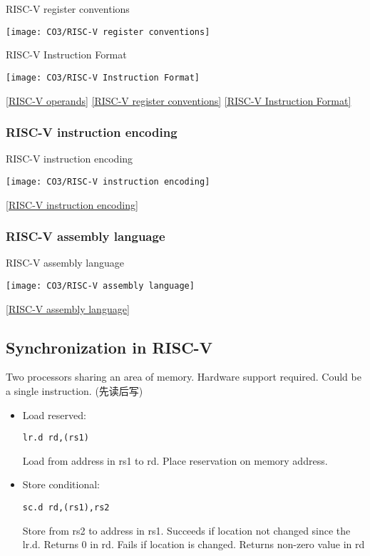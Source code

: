 \begin{table*}[hptb]
    \centering
    \caption{RISC-V register conventions}
    \label{RISC-V register conventions}
    \texttt{[image: CO3/RISC-V register conventions]}
\end{table*}

\begin{table*}[hptb]
    \centering
    \caption{RISC-V Instruction Format}
    \label{RISC-V Instruction Format}
    \texttt{[image: CO3/RISC-V Instruction Format]}
\end{table*}

\ref{RISC-V operands}
\ref{RISC-V register conventions}
\ref{RISC-V Instruction Format}



\subsubsection{RISC-V instruction encoding}
\begin{table*}[hptb]
    \centering
    \caption{RISC-V instruction encoding}
    \label{RISC-V instruction encoding}
    \texttt{[image: CO3/RISC-V instruction encoding]}
\end{table*}
\ref{RISC-V instruction encoding}

\subsubsection{RISC-V assembly language}
\begin{table*}[hptb]
    \centering
    \caption{RISC-V assembly language}
    \label{RISC-V assembly language}
    \texttt{[image: CO3/RISC-V assembly language]}
\end{table*}
\ref{RISC-V assembly language}


\subsection{Synchronization in RISC-V}
Two processors sharing an area of memory. Hardware support required. Could be a single instruction. (先读后写)

\begin{itemize}
    \item Load reserved: 
    \begin{lstlisting}[language={[x86masm]Assembler}]
lr.d rd,(rs1)
    \end{lstlisting}
    Load from address in rs1 to rd. Place reservation on memory address. 
    \item Store conditional:
    \begin{lstlisting}[language={[x86masm]Assembler}]
sc.d rd,(rs1),rs2
    \end{lstlisting}
    Store from rs2 to address in rs1. Succeeds if location not changed since the lr.d. Returns 0 in rd. Fails if location is changed. Returns non-zero value in rd
\end{itemize}


